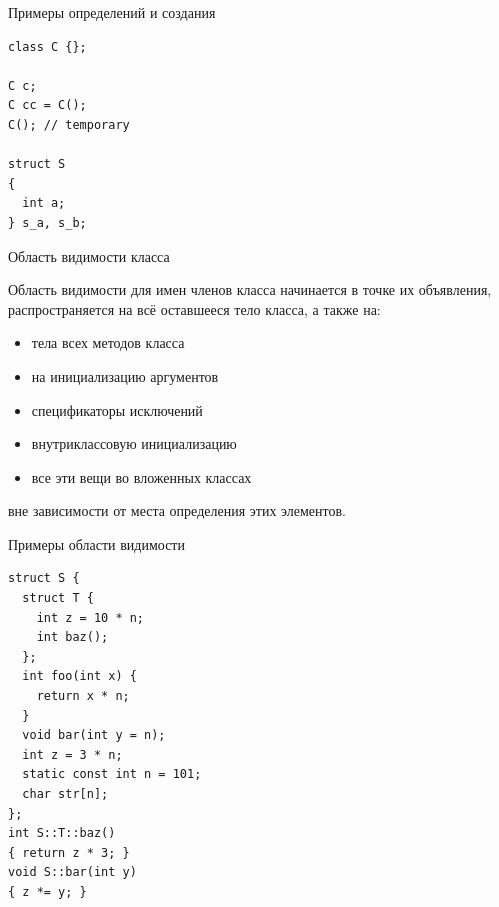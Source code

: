 \documentclass[unknownkeysallowed,xcolor=table]{beamer}
\begin{document}
\begin{frame}[fragile]{Примеры определений и создания}

\begin{lstlisting}
class C {};

C c;
C cc = C();
C(); // temporary

struct S
{
  int a;
} s_a, s_b;
\end{lstlisting}

\end{frame}

\begin{frame}{Область видимости класса}

Область видимости для имен членов класса начинается в точке их объявления, распространяется на всё оставшееся тело класса, а также на:

\vspace{0.5em}

\begin{itemize}
  \item тела всех методов класса \vspace{0.5em}
  \item на инициализацию аргументов \vspace{0.5em}
  \item спецификаторы исключений \vspace{0.5em}
  \item внутриклассовую инициализацию \vspace{0.5em}
  \item все эти вещи во вложенных классах
\end{itemize}

\vspace{0.5em}

вне зависимости от места определения этих элементов.

\end{frame}

\begin{frame}[fragile]{Примеры области видимости}

\begin{lstlisting}
struct S {
  struct T {
    int z = 10 * n;
    int baz();
  };
  int foo(int x) {
    return x * n;
  }
  void bar(int y = n);
  int z = 3 * n;
  static const int n = 101;
  char str[n];
};
int S::T::baz()
{ return z * 3; }
void S::bar(int y)
{ z *= y; }
\end{lstlisting}

\end{frame}
\end{document}
